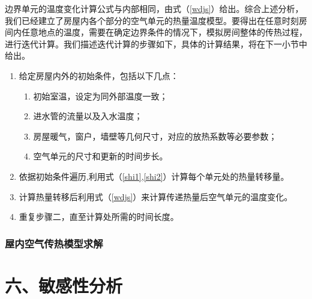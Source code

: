 \documentclass{my_paper}
\renewenvironment{framed}[1][\hsize]
  {\MakeFramed{\hsize#1\advance\hsize-\width \FrameRestore}}%
  {\endMakeFramed}
\begin{document}
边界单元的温度变化计算公式与内部相同，由式（\ref{wdjs}）给出。综合上述分析，我们已经建立了房屋内各个部分的空气单元的热量温度模型。要得出在任意时刻房间内任意地点的温度，需要在确定边界条件的情况下，模拟房间整体的传热过程，进行迭代计算。我们描述迭代计算的步骤如下，具体的计算结果，将在下一小节中给出。
{
    \renewcommand\theenumi{\chinese{enumi}}
    \renewcommand\labelenumi{\textbf{步骤\theenumi：}}
    \begin{framed}[0.7\textwidth]
        \centering
        \begin{minipage}[h][0.9\textwidth][c]{24em}
            \begin{enumerate}
                \item 给定房屋内外的初始条件，包括以下几点：
                \begin{enumerate}
                    \item 初始室温，设定为同外部温度一致；
                    \item 进水管的流量以及入水温度；
                    \item 房屋暖气，窗户，墙壁等几何尺寸，对应的放热系数等必要参数；
                    \item 空气单元的尺寸和更新的时间步长。
                \end{enumerate}
                \item 依据初始条件遍历,利用式（\ref{shi1},\ref{shi2}）计算每个单元处的热量转移量。
                \item 计算热量转移后利用式（\ref{wdjs}）来计算传递热量后空气单元的温度变化。
                \item 重复步骤二，直至计算处所需的时间长度。
            \end{enumerate}
        \end{minipage}
\end{framed}
}

\subsubsection{屋内空气传热模型求解}

\subsection{}


\section{六、敏感性分析}
\end{document}
